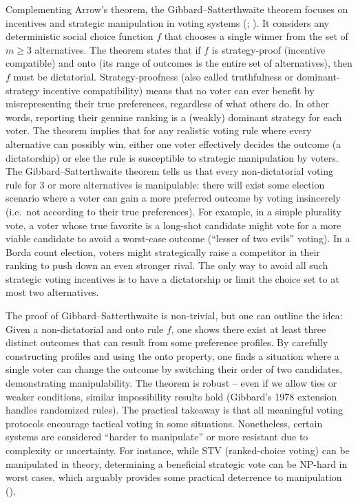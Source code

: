 \documentclass[
  letterpaper,
  numbers=noenddot,
  DIV=11]{scrreprt}
\theoremstyle{plain}
\theoremstyle{definition}
\theoremstyle{remark}
\begin{document}
Complementing Arrow's theorem, the Gibbard--Satterthwaite theorem
focuses on incentives and strategic manipulation in voting systems
(;
). It considers any
deterministic social choice function \(f\) that chooses a single winner
from the set of \(m\ge 3\) alternatives. The theorem states that if
\(f\) is strategy-proof (incentive compatible) and onto (its range of
outcomes is the entire set of alternatives), then \(f\) must be
dictatorial. Strategy-proofness (also called truthfulness or
dominant-strategy incentive compatibility) means that no voter can ever
benefit by misrepresenting their true preferences, regardless of what
others do. In other words, reporting their genuine ranking is a (weakly)
dominant strategy for each voter. The theorem implies that for any
realistic voting rule where every alternative can possibly win, either
one voter effectively decides the outcome (a dictatorship) or else the
rule is susceptible to strategic manipulation by voters. The
Gibbard--Satterthwaite theorem tells us that every non-dictatorial
voting rule for 3 or more alternatives is manipulable: there will exist
some election scenario where a voter can gain a more preferred outcome
by voting insincerely (i.e.~not according to their true preferences).
For example, in a simple plurality vote, a voter whose true favorite is
a long-shot candidate might vote for a more viable candidate to avoid a
worst-case outcome (``lesser of two evils'' voting). In a Borda count
election, voters might strategically raise a competitor in their ranking
to push down an even stronger rival. The only way to avoid all such
strategic voting incentives is to have a dictatorship or limit the
choice set to at most two alternatives.

The proof of Gibbard--Satterthwaite is non-trivial, but one can outline
the idea: Given a non-dictatorial and onto rule \(f\), one shows there
exist at least three distinct outcomes that can result from some
preference profiles. By carefully constructing profiles and using the
onto property, one finds a situation where a single voter can change the
outcome by switching their order of two candidates, demonstrating
manipulability. The theorem is robust -- even if we allow ties or weaker
conditions, similar impossibility results hold (Gibbard's 1978 extension
handles randomized rules). The practical takeaway is that all meaningful
voting protocols encourage tactical voting in some situations.
Nonetheless, certain systems are considered ``harder to manipulate'' or
more resistant due to complexity or uncertainty. For instance, while STV
(ranked-choice voting) can be manipulated in theory, determining a
beneficial strategic vote can be NP-hard in worst cases, which arguably
provides some practical deterrence to manipulation
().
\end{document}
